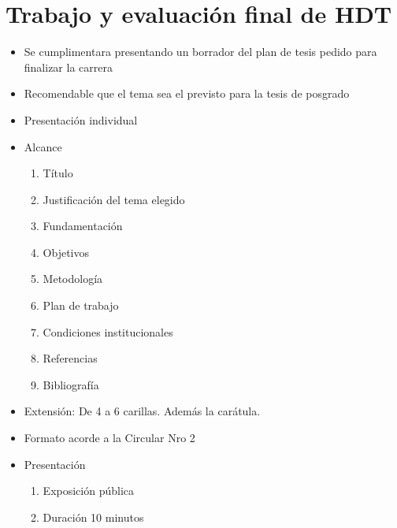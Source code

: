 \documentclass[
	11pt,oneside,a4paper,
	headsepline,footsepline,plainfootsepline,plainheadsepline,
	fleqn,
	flushbottom,
	raggedbottom
]{memoir}
\begin{document}
	\section*{Trabajo y evaluación final de HDT}
	\begin{itemize}
		\item Se cumplimentara presentando un borrador del plan de tesis pedido para finalizar la carrera
		\item Recomendable que el tema sea el previsto para la tesis de posgrado
		\item Presentación individual
		\item Alcance
		\begin{enumerate}
			\item Título
			\item Justificación del tema elegido
			\item Fundamentación
			\item Objetivos
			\item Metodología
			\item Plan de trabajo
			\item Condiciones institucionales
			\item Referencias
			\item Bibliografía 
		\end{enumerate}
		\item Extensión: De 4 a 6 carillas. Además la carátula.
		\item Formato acorde a la Circular Nro 2 
		\item Presentación
		\begin{enumerate}
			\item Exposición pública
			\item Duración 10 minutos		
		\end{enumerate}
	\end{itemize}
	
	\listoftodos[Pendientes]
	
	\fi
\end{document}
